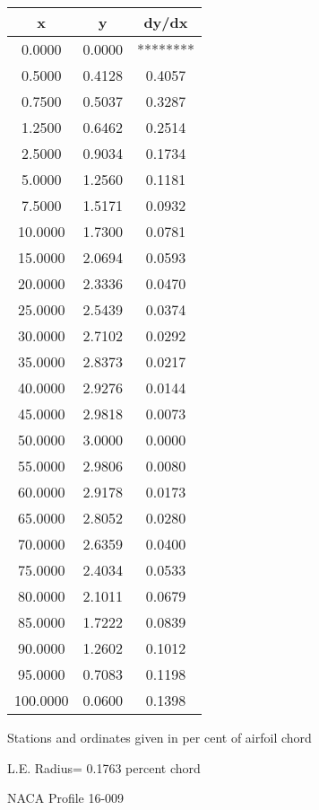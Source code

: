 \documentclass[11pt]{book}
\begin{document}
 \vspace{8mm}
 \begin{tabular}{|c|c|c|} \hline 
  x  &  y  &  dy/dx \\
 \hline
0.0000 & 0.0000 & ******** \\
0.5000 & 0.4128 & 0.4057 \\
0.7500 & 0.5037 & 0.3287 \\
1.2500 & 0.6462 & 0.2514 \\
2.5000 & 0.9034 & 0.1734 \\
5.0000 & 1.2560 & 0.1181 \\
7.5000 & 1.5171 & 0.0932 \\
10.0000 & 1.7300 & 0.0781 \\
15.0000 & 2.0694 & 0.0593 \\
20.0000 & 2.3336 & 0.0470 \\
25.0000 & 2.5439 & 0.0374 \\
30.0000 & 2.7102 & 0.0292 \\
35.0000 & 2.8373 & 0.0217 \\
40.0000 & 2.9276 & 0.0144 \\
45.0000 & 2.9818 & 0.0073 \\
50.0000 & 3.0000 & 0.0000 \\
55.0000 & 2.9806 & 0.0080 \\
60.0000 & 2.9178 & 0.0173 \\
65.0000 & 2.8052 & 0.0280 \\
70.0000 & 2.6359 & 0.0400 \\
75.0000 & 2.4034 & 0.0533 \\
80.0000 & 2.1011 & 0.0679 \\
85.0000 & 1.7222 & 0.0839 \\
90.0000 & 1.2602 & 0.1012 \\
95.0000 & 0.7083 & 0.1198 \\
100.0000 & 0.0600 & 0.1398 \\
 \hline
 \end{tabular}
 \vspace{8mm}


Stations and ordinates given in per cent of airfoil chord 


L.E. Radius=  0.1763 percent chord
 \newpage
  \label{p16-009}
 \begin{Large}
 NACA Profile 16-009
 \end{Large}
  
\end{document}
